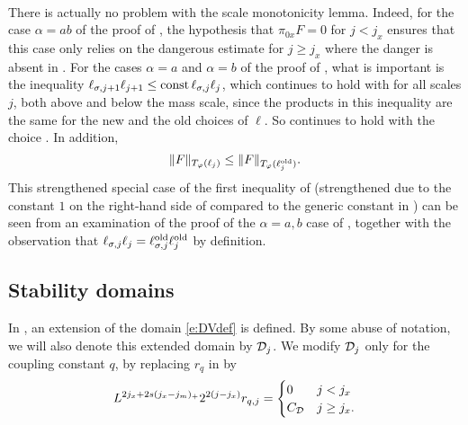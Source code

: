\paragraph{\cite[Lemma \ref{IE-lem:Imono}]{BS-rg-IE}}
There is actually no problem with the scale monotonicity lemma.
Indeed, for the case $\alpha =ab$ of the proof of
\cite[Lemma \ref{IE-lem:Imono}]{BS-rg-IE}, the hypothesis that
$\pi_{0x}F=0$ for $j<j_{x}$ ensures that this case only relies on the dangerous
estimate for $j \ge j_x$ where the danger is absent in .
For the cases $\alpha=a$ and $\alpha =b$ of the proof of
\cite[Lemma \ref{IE-lem:Imono}]{BS-rg-IE}, what is
important is the inequality
$\ell_{\sigma,j+1}\ell_{j+1} \le {\rm const}\, \ell_{\sigma,j}\ell_{j}$, which
continues to hold with
 for all scales $j$, both above and below the mass scale, since
the products in this inequality are the same for the new and the old choices of $\ell$.
So \cite[Lemma \ref{IE-lem:Imono}]{BS-rg-IE} continues to hold with the choice
.
In addition,
\begin{equation}
\label{e:norm-change}
\|F\|_{T_\varphi(\ell_j)} \leq  \|F\|_{T_\varphi(\ell^{\mathrm{old}}_j)}.
\end{equation}
This strengthened special case of the first inequality of
\cite[\eqref{IE-e:scale-change}]{BS-rg-IE} (strengthened due to the constant
$1$ on the right-hand side of  compared to
the generic constant in \cite[\eqref{IE-e:scale-change}]{BS-rg-IE})
can be seen from an examination of the proof of the $\alpha =a,b$ case of
\cite[Lemma \ref{IE-lem:Imono}]{BS-rg-IE}, together with the observation that
$\ell_{\sigma,j}\ell_{j} = \ell_{\sigma,j}^{\rm old} \ell_j^{\rm old}$ by definition.


\subsection{Stability domains}
\label{sec:stability1}

In \cite[\eqref{IE-e:DV1-bis}]{BS-rg-IE}, an extension of the domain \eqref{e:DVdef}
is defined. By some abuse of notation, we will also denote this extended domain by
$\mathcal{D}_j$. We modify $\mathcal{D}_j$ only for the coupling constant $q$, by replacing $r_q$
in \cite[\eqref{IE-e:h-coupling-def-1-bis}]{BS-rg-IE} by
\begin{equation}
\lbeq{newrq}
L^{2j_x + 2 s (j_x - j_m)_+} 2^{2(j-j_x)} r_{q,j} =
\begin{cases}
  0 & j < j_x \\
  C_{\DV}  & j \ge j_x.
\end{cases}
\end{equation}

